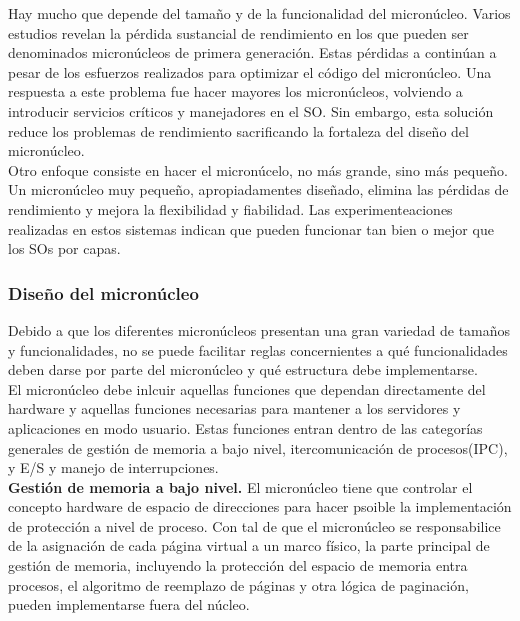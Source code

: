 \documentclass{article}
\begin{document}
				Hay mucho que depende del tamaño y de la funcionalidad del micronúcleo. Varios estudios revelan la pérdida sustancial de rendimiento en los que pueden ser denominados micronúcleos de primera generación. Estas pérdidas a continúan a pesar de los esfuerzos realizados para optimizar el código del micronúcleo. Una respuesta a este problema fue hacer mayores los micronúcleos, volviendo a introducir servicios críticos y manejadores en el SO. Sin embargo, esta solución reduce los problemas de rendimiento sacrificando la fortaleza del diseño del micronúcleo. \\
				
				Otro enfoque consiste en hacer el micronúcelo, no más grande, sino más pequeño. Un micronúcleo muy pequeño, apropiadamentes diseñado, elimina las pérdidas de rendimiento y mejora la flexibilidad y fiabilidad. Las experimenteaciones realizadas en estos sistemas indican que pueden funcionar tan bien o mejor que los SOs por capas.
				
			\subsubsection{Diseño del micronúcleo}
				Debido a que los diferentes micronúcleos presentan una gran variedad de tamaños y funcionalidades, no se puede facilitar reglas concernientes a qué funcionalidades deben darse por parte del micronúcleo y qué estructura debe implementarse.  \\
				
				El micronúcleo debe inlcuir aquellas funciones que dependan directamente del hardware y aquellas funciones necesarias para mantener a los servidores y aplicaciones en modo usuario. Estas funciones entran dentro de las categorías generales de gestión de memoria a bajo nivel, itercomunicación de procesos(IPC), y E/S y manejo de interrupciones. \\
				
				\textbf{Gestión de memoria a bajo nivel.} El micronúcleo tiene que controlar el concepto hardware de espacio de direcciones para hacer psoible la implementación de protección a nivel de proceso. Con tal de que el micronúcleo se responsabilice de la asignación de cada página virtual a un marco físico, la parte principal de gestión de memoria, incluyendo la protección del espacio de memoria entra procesos, el algoritmo de reemplazo de páginas y otra lógica de paginación, pueden implementarse fuera del núcleo. \\
				
\end{document}
